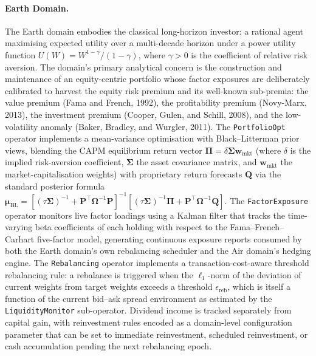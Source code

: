 \documentclass[12pt,openany]{book}
\numberwithin{equation}{chapter}
\theoremstyle{plain}
\theoremstyle{definition}
\theoremstyle{remark}
\begin{document}
\paragraph{Earth Domain.}
The Earth domain embodies the classical long-horizon investor: a rational agent maximising expected utility over a multi-decade horizon under a power utility function $U(W) = W^{1-\gamma}/(1-\gamma)$, where $\gamma > 0$ is the coefficient of relative risk aversion. The domain's primary analytical concern is the construction and maintenance of an equity-centric portfolio whose factor exposures are deliberately calibrated to harvest the equity risk premium and its well-known sub-premia: the value premium (Fama and French, 1992), the profitability premium (Novy-Marx, 2013), the investment premium (Cooper, Gulen, and Schill, 2008), and the low-volatility anomaly (Baker, Bradley, and Wurgler, 2011). The \texttt{PortfolioOpt} operator implements a mean-variance optimisation with Black--Litterman prior views, blending the CAPM equilibrium return vector $\boldsymbol{\Pi} = \delta \boldsymbol{\Sigma} \mathbf{w}_{\mathrm{mkt}}$ (where $\delta$ is the implied risk-aversion coefficient, $\boldsymbol{\Sigma}$ the asset covariance matrix, and $\mathbf{w}_{\mathrm{mkt}}$ the market-capitalisation weights) with proprietary return forecasts $\mathbf{Q}$ via the standard posterior formula $\boldsymbol{\mu}_{\mathrm{BL}} = [(\tau \boldsymbol{\Sigma})^{-1} + \mathbf{P}^\top \boldsymbol{\Omega}^{-1} \mathbf{P}]^{-1}[(\tau \boldsymbol{\Sigma})^{-1} \boldsymbol{\Pi} + \mathbf{P}^\top \boldsymbol{\Omega}^{-1} \mathbf{Q}]$. The \texttt{FactorExposure} operator monitors live factor loadings using a Kalman filter that tracks the time-varying beta coefficients of each holding with respect to the Fama--French--Carhart five-factor model, generating continuous exposure reports consumed by both the Earth domain's own rebalancing scheduler and the Air domain's hedging engine. The \texttt{Rebalancing} operator implements a transaction-cost-aware threshold rebalancing rule: a rebalance is triggered when the $\ell_1$-norm of the deviation of current weights from target weights exceeds a threshold $\epsilon_{\mathrm{reb}}$, which is itself a function of the current bid--ask spread environment as estimated by the \texttt{LiquidityMonitor} sub-operator. Dividend income is tracked separately from capital gain, with reinvestment rules encoded as a domain-level configuration parameter that can be set to immediate reinvestment, scheduled reinvestment, or cash accumulation pending the next rebalancing epoch.
\end{document}

